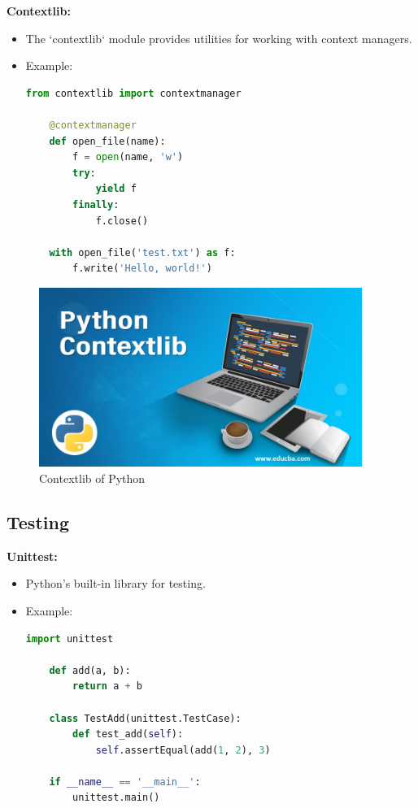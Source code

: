 \documentclass[12pt]{article}
\begin{document}
\textbf{Contextlib:}
\begin{itemize}
    \item The `contextlib` module provides utilities for working with context managers.

    \item Example:\\
    \begin{lstlisting}[language = Python]
    from contextlib import contextmanager

    @contextmanager
    def open_file(name):
        f = open(name, 'w')
        try:
            yield f
        finally:
            f.close()
    
    with open_file('test.txt') as f:
        f.write('Hello, world!')
    \end{lstlisting}
    
\end{itemize}

\begin{figure}[h!]
\begin{center}
\includegraphics[width=10.5cm]{advanced5.jpg}\\
Contextlib of Python
\end{center}
\end{figure}


\subsection{Testing}

\textbf{Unittest:}
\begin{itemize}
    \item Python's built-in library for testing.

    \item Example:\\
    \begin{lstlisting}[language = Python]
    import unittest

    def add(a, b):
        return a + b
    
    class TestAdd(unittest.TestCase):
        def test_add(self):
            self.assertEqual(add(1, 2), 3)
    
    if __name__ == '__main__':
        unittest.main()
    \end{lstlisting}
    
\end{itemize}
\end{document}
